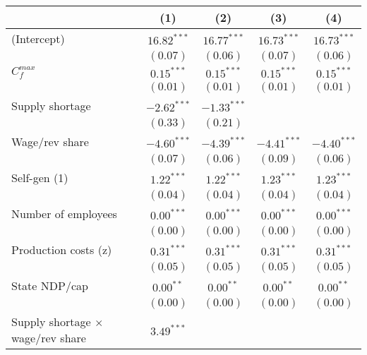 
\begin{tabular}{l c c c c }
\toprule
 & (1) & (2) & (3) & (4) \\
\midrule
(Intercept)                               & $16.82^{***}$ & $16.77^{***}$ & $16.73^{***}$ & $16.73^{***}$ \\
                                          & $(0.07)$      & $(0.06)$      & $(0.07)$      & $(0.06)$      \\
$C^{max}_{f}$                             & $0.15^{***}$  & $0.15^{***}$  & $0.15^{***}$  & $0.15^{***}$  \\
                                          & $(0.01)$      & $(0.01)$      & $(0.01)$      & $(0.01)$      \\
Supply shortage                           & $-2.62^{***}$ & $-1.33^{***}$ &               &               \\
                                          & $(0.33)$      & $(0.21)$      &               &               \\
Wage/rev share                            & $-4.60^{***}$ & $-4.39^{***}$ & $-4.41^{***}$ & $-4.40^{***}$ \\
                                          & $(0.07)$      & $(0.06)$      & $(0.09)$      & $(0.06)$      \\
Self-gen (1)                              & $1.22^{***}$  & $1.22^{***}$  & $1.23^{***}$  & $1.23^{***}$  \\
                                          & $(0.04)$      & $(0.04)$      & $(0.04)$      & $(0.04)$      \\
Number of employees                       & $0.00^{***}$  & $0.00^{***}$  & $0.00^{***}$  & $0.00^{***}$  \\
                                          & $(0.00)$      & $(0.00)$      & $(0.00)$      & $(0.00)$      \\
Production costs (z)                      & $0.31^{***}$  & $0.31^{***}$  & $0.31^{***}$  & $0.31^{***}$  \\
                                          & $(0.05)$      & $(0.05)$      & $(0.05)$      & $(0.05)$      \\
State NDP/cap                             & $0.00^{**}$   & $0.00^{**}$   & $0.00^{**}$   & $0.00^{**}$   \\
                                          & $(0.00)$      & $(0.00)$      & $(0.00)$      & $(0.00)$      \\
Supply shortage $\times$ wage/rev share   & $3.49^{***}$  &               &               &               \\

\end{tabular}
